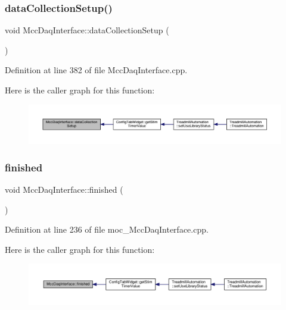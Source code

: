 \subsubsection{\texorpdfstring{data\+Collection\+Setup()}{dataCollectionSetup()}}
{\footnotesize\ttfamily void Mcc\+Daq\+Interface\+::data\+Collection\+Setup (\begin{DoxyParamCaption}{ }\end{DoxyParamCaption})}



Definition at line 382 of file Mcc\+Daq\+Interface.\+cpp.

Here is the caller graph for this function\+:
\nopagebreak
\begin{figure}[H]
\begin{center}
\leavevmode
\includegraphics[width=350pt]{class_mcc_daq_interface_af4fee75cc1637188c98bd7c1ddc745a2_icgraph}
\end{center}
\end{figure}
\mbox{\label{class_mcc_daq_interface_a6bd42e5902e34571262f1fe1b1eb987c}} 
\subsubsection{\texorpdfstring{finished}{finished}}
{\footnotesize\ttfamily void Mcc\+Daq\+Interface\+::finished (\begin{DoxyParamCaption}{ }\end{DoxyParamCaption})\hspace{0.3cm}{\ttfamily [signal]}}



Definition at line 236 of file moc\+\_\+\+Mcc\+Daq\+Interface.\+cpp.

Here is the caller graph for this function\+:
\nopagebreak
\begin{figure}[H]
\begin{center}
\leavevmode
\includegraphics[width=350pt]{class_mcc_daq_interface_a6bd42e5902e34571262f1fe1b1eb987c_icgraph}
\end{center}
\end{figure}
\mbox{\label{class_mcc_daq_interface_ac2e329b0d2d52885d1fe96c64df3331a}} 
